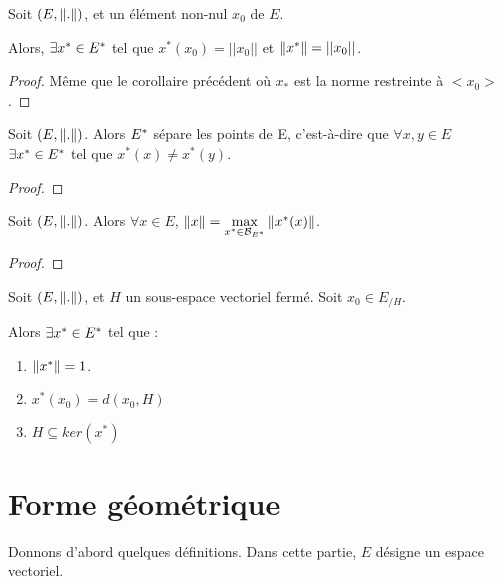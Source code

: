 \begin{corollary}
	Soit $(E, \norm{.})$, et un élément non-nul $x_{0}$ de $E$.

	Alors, $\exists x^{*} \in E^{*}$ tel que $x^{*}(x_{0}) = ||x_{0}||$ et
	$\norm{x^{*}} = ||x_{0}||$.
\end{corollary}

\begin{proof}
	Même que le corollaire précédent où $x_{*}$ est la norme restreinte à
	$<x_{0}>$.
\end{proof}

\begin{corollary}
	Soit $(E, \norm{.})$. Alors $E^{*}$ sépare les points de
	E, c'est-à-dire que $\forall x, y \in E$ $\exists x^{*} \in E^{*}$ tel
	que $x^{*}(x) \neq x^{*}(y)$.
\end{corollary}

\begin{proof}

\end{proof}

\begin{corollary}
	Soit $(E, \norm{.})$. Alors $\forall x \in E$, $\norm{x}
	= \max\limits_{x^{*} \in \mathcal{B}_{E^{*}}} \norm{x^{*}(x)}$.
\end{corollary}

\begin{proof}

\end{proof}

\begin{corollary}
	Soit $(E, \norm{.})$, et $H$ un sous-espace vectoriel fermé.
	Soit $x_{0} \in E_{/H}$.

	Alors $\exists x^{*} \in E^{*}$ tel que :

	\begin{enumerate}
		\item $\norm{x^{*}} = 1$.
		\item $x^{*}(x_{0}) = d(x_{0}, H)$
		\item $H \subseteq ker(x^{*})$
	\end{enumerate}
\end{corollary}

\section{Forme géométrique}

Donnons d'abord quelques définitions. Dans cette partie, $E$ désigne un espace
vectoriel.

